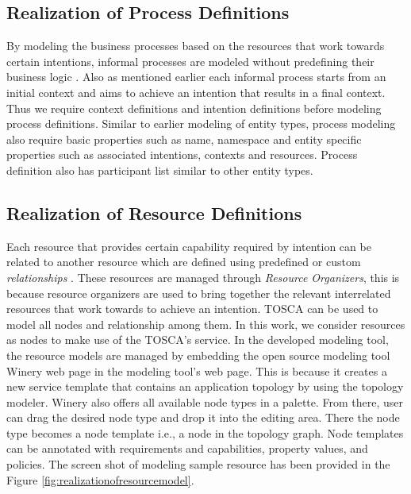 \subsection{Realization of Process Definitions}
By modeling the business processes based on the resources that work towards certain intentions, informal processes are modeled without predefining their business logic \cite{Sungur2014a}. Also as mentioned earlier each informal process starts from an initial context and aims to achieve an intention that results in a final context. Thus we require context definitions and intention definitions before modeling process definitions. Similar to earlier modeling of entity types, process modeling also require basic properties such as name, namespace  and entity specific properties such as associated intentions, contexts and resources. Process definition also has participant list similar to other entity types. 

\subsection{Realization of Resource Definitions}
Each resource that provides certain capability required by intention can be related to another resource which are defined using predefined or custom \textit{relationships} \cite{Sungur2014a}. These resources are managed through \textit{Resource Organizers}, this is because resource organizers are used to bring together the relevant interrelated resources that work towards to achieve an intention. TOSCA \cite{Binz2014} can be used to model all nodes and relationship among them. In this work, we consider resources as nodes to make use of the TOSCA's service. In the developed modeling tool, the resource models are managed by embedding the open source modeling tool Winery web page \cite{Kopp2013} in the modeling tool's web page. This is because it creates a new service template that contains an application topology by using the topology modeler. Winery also offers all available node types in a palette. From there, user can drag the desired node type and drop it into the editing area. There the node type becomes a node template i.e., a node in the topology graph. Node templates can be annotated with requirements and capabilities, property values, and policies. The screen shot of modeling sample resource has been provided in the Figure \ref{fig:realizationofresourcemodel}. 

